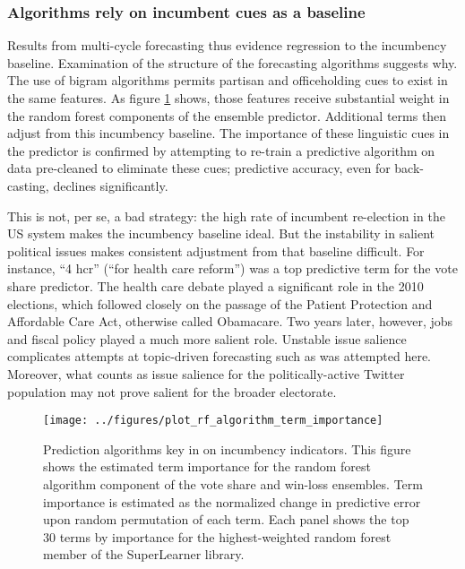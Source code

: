 \documentclass{article}
\begin{document}
\subsubsection{Algorithms rely on incumbent cues as a baseline}
\label{sec:algor-behav-perf}

Results from multi-cycle forecasting thus evidence regression to
the incumbency baseline. Examination of the structure of the
forecasting algorithms suggests why. The use of
bigram algorithms permits partisan and officeholding cues to exist in
the same features. As figure \ref{fig:rf-term-importance} shows, those
features receive substantial weight in the random forest components of
the ensemble predictor. Additional terms then adjust from this incumbency baseline. The
importance of these linguistic cues in the predictor is confirmed by
attempting to re-train a predictive algorithm on data pre-cleaned to
eliminate these cues; predictive accuracy, even for back-casting,
declines significantly.

This is not, per se, a bad strategy: the high rate of incumbent
re-election in the US system makes the incumbency baseline ideal. But
the instability in salient political issues makes consistent
adjustment from that baseline difficult. For instance, ``4 hcr''
(``for health care reform'') was a
top predictive term for the vote share predictor. The health care debate played a
significant role in the 2010 elections, which followed closely on the
passage of the Patient Protection and Affordable Care Act, otherwise
called Obamacare. Two years later, however, jobs and fiscal policy
played a much more salient role. Unstable issue salience complicates
attempts at topic-driven forecasting such as was attempted
here. Moreover, what counts as issue salience for the
politically-active Twitter population may not prove salient for the
broader electorate. 

\begin{figure}[ht]
  \centering
  \texttt{[image: ../figures/plot\_rf\_algorithm\_term\_importance]}
  \caption{Prediction algorithms key in on incumbency
    indicators. This figure shows the estimated term importance for the random forest algorithm component
    of the vote share and win-loss ensembles. Term importance is
    estimated as the normalized change in predictive error upon
    random permutation of each term. Each panel shows the top
    30 terms by importance for the highest-weighted random forest
    member of the SuperLearner library.}
  \label{fig:rf-term-importance}
\end{figure}
\end{document}
